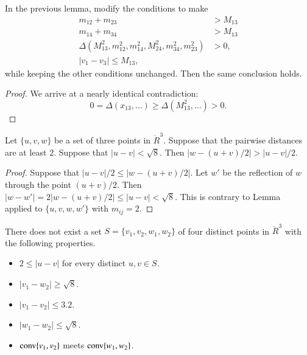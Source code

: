 \newpage

\begin{lemma}  
In the previous lemma, modify the conditions to make
    $$
    \begin{array}{lll}
      	m_{12} + m_{23} &> M_{13}\\
	m_{14} + m_{34} &> M_{13}\\
  \Delta(M^2_{13},m^2_{12},m^2_{14},M^2_{24},
		m^2_{34},m^2_{23}) &> 0,\\
                |v_1-v_3|\le M_{13},
      \end{array}
    $$
while keeping the other conditions unchanged.  Then the same conclusion
holds.
\end{lemma}

\begin{proof}  We arrive at a nearly identical contradiction:
  $$ 0 = \Delta(x_{13},\ldots) \ge \Delta(M^2_{13},\ldots) > 0.$$
\end{proof}

\newpage


\begin{lemma}
  Let $\{u,v,w\}$ be a set of three points in $\ring{R}^3$.  Suppose
that the pairwise distances are at least $2$.  Suppose that 
$|u-v| <\sqrt8$.  Then $|w- (u+v)/2| > |u-v|/2$.
\end{lemma}

\begin{proof} Suppose that $|u-v|/2\le |w-(u+v)/2|$.
Let $w'$ be the reflection of $w$ through the point
$(u+v)/2$.  Then $|w-w'| = 2|w-(u+v)/2|\le |u-v| <\sqrt8$.
This is contrary to Lemma~ applied to
$\{u,v,w,w'\}$ with $m_{ij}=2$.  
\end{proof}


\newpage

\begin{lemma} 
There does not exist a set
$S=\{v_1,v_2,w_1,w_2\}$ of four distinct points
in $\ring{R}^3$ with the following properties.
\begin{itemize}
	\item $2\le |u-v|$ for every distinct $u,v\in S$.
          \item $|v_1-w_2|\ge \sqrt{8}$.
		\item $ |v_1-v_2| \le 3.2$.
	\item $|w_1-w_2|\le \sqrt{8}$.
	\item ${\operatorname{conv}}\{v_1,v_2\}$ meets
		${\operatorname{conv}}\{w_1,w_2\}$.
\end{itemize}
\end{lemma}


